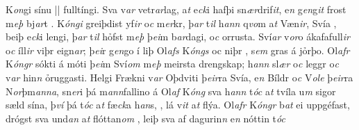 K\textit{on}gi sínu 
||
 fulltíngi. Sva v\textit{ar} vetr\textit{ar}lag, a\textit{t}
e\textit{ck}i hafþi sn\textit{ær}drif\textit{it},  e\textit{n}
g\textit{en}g\textit{it}  frost m\textit{eþ} bj\textit{ar}t  . 
K\textit{óngi} greiþdist   yf\textit{ir}  o\textit{c} m\textit{er}kr, þ\textit{ar} t\textit{il} h\textit{ann}
q\textit{vo}m a\textit{t} Væn\textit{ir},     Svía  , beiþ   e\textit{ck}i lengi, þ\textit{ar} t\textit{il}  hỏfst m\textit{eþ} þ\textit{ei}m  b\textit{ar}dagi,
o\textit{c}  orrusta. 
Sví\textit{ar} v\textit{or}o ákafafull\textit{ir}
o\textit{c} íll\textit{ir} viþr eign\textit{ar}; þ\textit{ei}r
g\textit{en}go í liþ Ol\textit{afs}
K\textit{óngs} oc   niþr  
, s\textit{em} gras á jỏrþo. 
 Ol\textit{afr} K\textit{óngr} sókti  á móti þ\textit{ei}m Sví\textit{om} m\textit{eþ} meirsta drengskap;
h\textit{ann} sl\textit{ær} o\textit{c} leggr   o\textit{c} v\textit{ar} hin\textit{n} ỏruggasti. 
Helgi Frækni v\textit{ar}  Oþdviti   þ\textit{eir}ra Svía,
e\textit{n} Bíldr o\textit{c} V\textit{ole} þ\textit{eir}ra N\textit{or}þm\textit{anna}, sn\textit{er}i þá m\textit{ann}fallino á
Ol\textit{af} K\textit{óng} sva h\textit{ann} t\textit{óc} a\textit{t}  tvíla   u\textit{m} sigor sæld sína, þ\textit{ví} þá t\textit{óc} a\textit{t}
fæ\textit{ck}a   h\textit{an}s,  , lá     v\textit{it} a\textit{t} flýa. Ol\textit{afr} K\textit{óngr} 
b\textit{at}  ei  uppgéfast, drógst sva und\textit{an} a\textit{t}
flóttan\textit{om}  , leiþ sva af dagurin\textit{n} e\textit{n} nóttin t\textit{óc}
